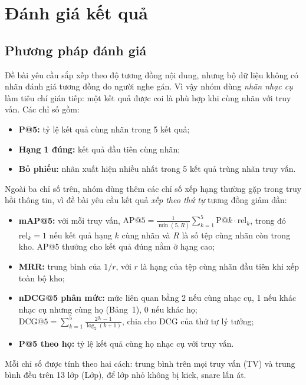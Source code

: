 \documentclass[11pt,a4paper]{article}
\begin{document}
\section{Đánh giá kết quả}\label{sec:danhgia}
\subsection{Phương pháp đánh giá}
Đề bài yêu cầu sắp xếp theo độ tương đồng nội dung, nhưng bộ dữ liệu không có nhãn đánh giá tương đồng do người nghe gán. Vì vậy nhóm dùng \emph{nhãn nhạc cụ} làm tiêu chí gián tiếp: một kết quả được coi là phù hợp khi cùng nhãn với truy vấn. Các chỉ số gồm:
\begin{itemize}
\item \textbf{P@5:} tỷ lệ kết quả cùng nhãn trong 5 kết quả;
\item \textbf{Hạng 1 đúng:} kết quả đầu tiên cùng nhãn;
\item \textbf{Bỏ phiếu:} nhãn xuất hiện nhiều nhất trong 5 kết quả trùng nhãn truy vấn.
\end{itemize}
Ngoài ba chỉ số trên, nhóm dùng thêm các chỉ số xếp hạng thường gặp trong truy hồi thông tin, vì đề bài yêu cầu kết quả \emph{xếp theo thứ tự} tương đồng giảm dần:
\begin{itemize}
\item \textbf{mAP@5:} với mỗi truy vấn, $\mathrm{AP@5}=\frac{1}{\min(5,R)}\sum_{k=1}^{5}\mathrm{P@}k\cdot \mathrm{rel}_k$, trong đó $\mathrm{rel}_k=1$ nếu kết quả hạng $k$ cùng nhãn và $R$ là số tệp cùng nhãn còn trong kho. AP@5 thưởng cho kết quả đúng nằm ở hạng cao;
\item \textbf{MRR:} trung bình của $1/r$, với $r$ là hạng của tệp cùng nhãn đầu tiên khi xếp toàn bộ kho;
\item \textbf{nDCG@5 phân mức:} mức liên quan bằng 2 nếu cùng nhạc cụ, 1 nếu khác nhạc cụ nhưng cùng họ (Bảng~1), 0 nếu khác họ; $\mathrm{DCG@5}=\sum_{k=1}^{5}\frac{2^{g_k}-1}{\log_2(k+1)}$, chia cho DCG của thứ tự lý tưởng;
\item \textbf{P@5 theo họ:} tỷ lệ kết quả cùng họ nhạc cụ với truy vấn.
\end{itemize}

Mỗi chỉ số được tính theo hai cách: trung bình trên mọi truy vấn (TV) và trung bình đều trên 13 lớp (Lớp), để lớp nhỏ không bị kick, snare lấn át.
\end{document}
